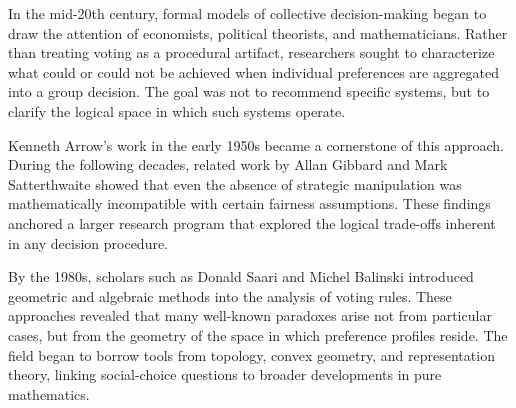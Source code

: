 \begin{historical}
In the mid-20th century, formal models of collective decision-making began to draw the attention of economists, political theorists, and mathematicians. Rather than treating voting as a procedural artifact, researchers sought to characterize what could or could not be achieved when individual preferences are aggregated into a group decision. The goal was not to recommend specific systems, but to clarify the logical space in which such systems operate.

Kenneth Arrow’s work in the early 1950s became a cornerstone of this approach. During the following decades, related work by Allan Gibbard and Mark Satterthwaite showed that even the absence of strategic manipulation was mathematically incompatible with certain fairness assumptions. These findings anchored a larger research program that explored the logical trade-offs inherent in any decision procedure.

By the 1980s, scholars such as Donald Saari and Michel Balinski introduced geometric and algebraic methods into the analysis of voting rules. These approaches revealed that many well-known paradoxes arise not from particular cases, but from the geometry of the space in which preference profiles reside. The field began to borrow tools from topology, convex geometry, and representation theory, linking social-choice questions to broader developments in pure mathematics.
\end{historical}
